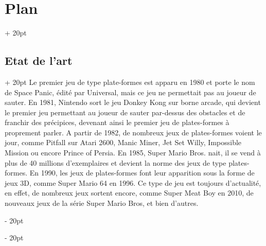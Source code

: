\documentclass[a4paper, 12pt, twoside]{article}
\newcommand{\ind}[1][20pt]{\advance\leftskip + #1}
\newcommand{\deind}[1][20pt]{\advance\leftskip - #1}
\newenvironment{indt}[2][20pt]{#2 \par \ind[#1]}{\par \deind} %
\begin{document}
\begin{indt}{\section{Plan}}
        \begin{indt}{\subsection{Etat de l'art}}
            Le premier jeu de type plate-formes est apparu en 1980 et porte le nom de Space Panic, édité par Universal, mais ce jeu ne permettait pas au joueur de sauter. En 1981, Nintendo sort le jeu Donkey Kong sur borne arcade, qui devient le premier jeu permettant au joueur de sauter par-dessus des obstacles et de franchir des précipices, devenant ainsi le premier jeu de plates-formes à proprement parler. A partir de 1982, de nombreux jeux de plates-formes voient le jour, comme Pitfall sur Atari 2600, Manic Miner, Jet Set Willy, Impossible Mission ou encore Prince of Persia. En 1985, Super Mario Bros. nait, il se vend à plus de 40 millions d'exemplaires et devient la norme des jeux de type plates-formes. En 1990, les jeux de plates-formes font leur apparition sous la forme de jeux 3D, comme Super Mario 64 en 1996. Ce type de jeu est toujours d'actualité, en effet, de nombreux jeux sortent encore, comme Super Meat Boy en 2010, de nouveaux jeux de la série Super Mario Bros, et bien d'autres.
        \end{indt}

        \newpage
        

\end{indt}
\end{document}
